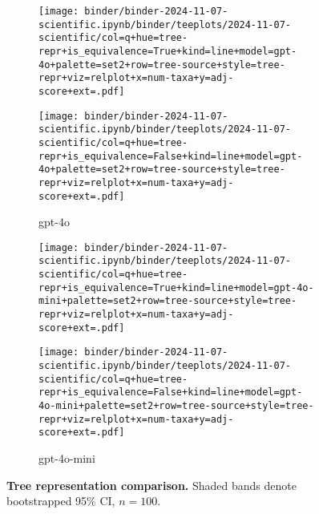 \begin{figure*}

\begin{subfigure}{\textwidth}
\begin{minipage}[b]{0.7365\textwidth}
\texttt{[image: binder/binder-2024-11-07-scientific.ipynb/binder/teeplots/2024-11-07-scientific/col=q+hue=tree-repr+is\_equivalence=True+kind=line+model=gpt-4o+palette=set2+row=tree-source+style=tree-repr+viz=relplot+x=num-taxa+y=adj-score+ext=.pdf]}
\end{minipage}%
\begin{minipage}[b]{0.01\textwidth}
\end{minipage}
\begin{minipage}[b]{0.2535\textwidth}
\texttt{[image: binder/binder-2024-11-07-scientific.ipynb/binder/teeplots/2024-11-07-scientific/col=q+hue=tree-repr+is\_equivalence=False+kind=line+model=gpt-4o+palette=set2+row=tree-source+style=tree-repr+viz=relplot+x=num-taxa+y=adj-score+ext=.pdf]}
\end{minipage}
\caption{gpt-4o}
\label{fig:treerepr:gpt-4o}
\end{subfigure}

\begin{subfigure}{\textwidth}
\begin{minipage}[b]{0.7365\textwidth}
\texttt{[image: binder/binder-2024-11-07-scientific.ipynb/binder/teeplots/2024-11-07-scientific/col=q+hue=tree-repr+is\_equivalence=True+kind=line+model=gpt-4o-mini+palette=set2+row=tree-source+style=tree-repr+viz=relplot+x=num-taxa+y=adj-score+ext=.pdf]}
\end{minipage}%
\begin{minipage}[b]{0.01\textwidth}
\end{minipage}
\begin{minipage}[b]{0.2535\textwidth}
\texttt{[image: binder/binder-2024-11-07-scientific.ipynb/binder/teeplots/2024-11-07-scientific/col=q+hue=tree-repr+is\_equivalence=False+kind=line+model=gpt-4o-mini+palette=set2+row=tree-source+style=tree-repr+viz=relplot+x=num-taxa+y=adj-score+ext=.pdf]}
\end{minipage}
\caption{gpt-4o-mini}
\label{fig:treerepr:gpt-4o-mini}
\end{subfigure}

\caption{
\textbf{Tree representation comparison.}
Shaded bands denote bootstrapped 95\% CI, $n=100$.
}
\label{fig:treerepr}

\end{figure*}
